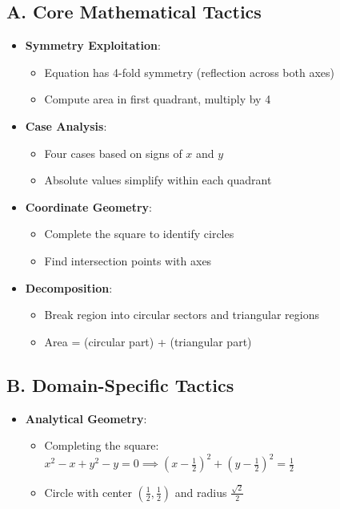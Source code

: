 \documentclass[]{article}
\begin{document}
\begin{tacticalbox}
\subsection*{A. Core Mathematical Tactics}
\begin{itemize}[leftmargin=*]
    \item \textbf{Symmetry Exploitation}: 
    \begin{itemize}
        \item Equation has 4-fold symmetry (reflection across both axes)
        \item Compute area in first quadrant, multiply by 4
    \end{itemize}
    
    \item \textbf{Case Analysis}: 
    \begin{itemize}
        \item Four cases based on signs of $x$ and $y$
        \item Absolute values simplify within each quadrant
    \end{itemize}
    
    \item \textbf{Coordinate Geometry}: 
    \begin{itemize}
        \item Complete the square to identify circles
        \item Find intersection points with axes
    \end{itemize}
    
    \item \textbf{Decomposition}: 
    \begin{itemize}
        \item Break region into circular sectors and triangular regions
        \item Area = (circular part) + (triangular part)
    \end{itemize}
\end{itemize}

\subsection*{B. Domain-Specific Tactics}
\begin{itemize}[leftmargin=*]
    \item \textbf{Analytical Geometry}: 
    \begin{itemize}
        \item Completing the square: $x^2 - x + y^2 - y = 0 \implies (x-\frac{1}{2})^2 + (y-\frac{1}{2})^2 = \frac{1}{2}$
        \item Circle with center $(\frac{1}{2}, \frac{1}{2})$ and radius $\frac{\sqrt{2}}{2}$
    \end{itemize}
    

\end{itemize}
\end{tacticalbox}
\end{document}
